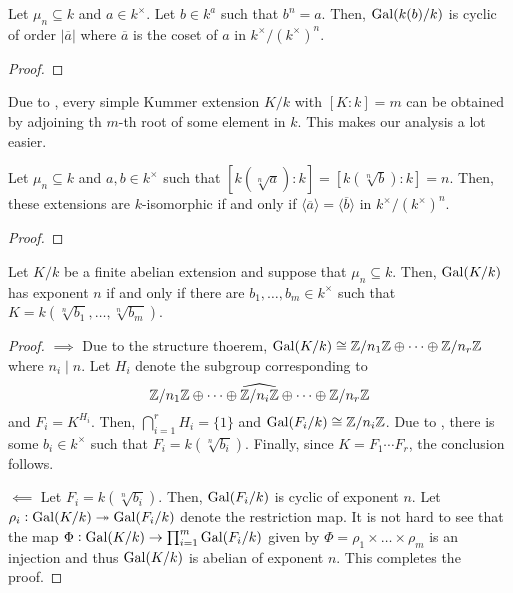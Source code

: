 \begin{theorem}
    Let $\mu_n\subseteq k$ and $a\in k^\times$. Let $b\in k^a$ such that $b^n = a$. Then, $\operatorname{Gal}(k(b)/k)$ is cyclic of order $|\overline a|$ where $\overline a$ is the coset of $a$ in $k^\times/(k^\times)^n$.
\end{theorem}
\begin{proof}

\end{proof}

\begin{remark}
    Due to , every simple Kummer extension $K/k$ with $[K:k] = m$ can be obtained by adjoining th $m$-th root of some element in $k$. This makes our analysis a lot easier.
\end{remark}

\begin{lemma}
    Let $\mu_n\subseteq k$ and $a,b\in k^\times$ such that $[k(\sqrt[n]{a}): k] = [k(\sqrt[n]{b}) : k] = n$. Then, these extensions are $k$-isomorphic if and only if $\langle\overline a\rangle = \langle\overline b\rangle$ in $k^\times/(k^\times)^n$.
\end{lemma}
\begin{proof}
    
\end{proof}

\begin{theorem}
    Let $K/k$ be a finite abelian extension and suppose that $\mu_n\subseteq k$. Then, $\operatorname{Gal}(K/k)$ has exponent $n$ if and only if there are $b_1,\dots,b_m\in k^\times$ such that $K = k(\sqrt[n]{b_1},\dots,\sqrt[n]{b_m})$.
\end{theorem}
\begin{proof}
    $\implies$ Due to the structure thoerem, $\operatorname{Gal}(K/k)\cong\mathbb{Z}/n_1\mathbb{Z}\oplus\dots\oplus\mathbb{Z}/n_r\mathbb{Z}$ where $n_i\mid n$. Let $H_i$ denote the subgroup corresponding to 
    \begin{equation*}
        \mathbb{Z}/n_1\mathbb{Z}\oplus\dots\oplus\widehat{\mathbb{Z}/n_i\mathbb{Z}}\oplus\dots\oplus\mathbb{Z}/n_r\mathbb{Z}
    \end{equation*}
    and $F_i = K^{H_i}$. Then, $\bigcap_{i = 1}^r H_i = \{1\}$ and $\operatorname{Gal}(F_i/k)\cong\mathbb{Z}/n_i\mathbb{Z}$. Due to , there is some $b_i\in k^\times$ such that $F_i = k(\sqrt[n]{b_i})$. Finally, since $K = F_1\cdots F_r$, the conclusion follows.

    $\impliedby$ Let $F_i = k(\sqrt[n]{b_i})$. Then, $\operatorname{Gal}(F_i/k)$ is cyclic of exponent $n$. Let $\rho_i: \operatorname{Gal}(K/k)\twoheadrightarrow\operatorname{Gal}(F_i/k)$ denote the restriction map. It is not hard to see that the map $\Phi:\operatorname{Gal}(K/k)\to\prod_{i = 1}^m\operatorname{Gal}(F_i/k)$ given by $\Phi = \rho_1\times\dots\times\rho_m$ is an injection and thus $\operatorname{Gal}(K/k)$ is abelian of exponent $n$. This completes the proof.
\end{proof}